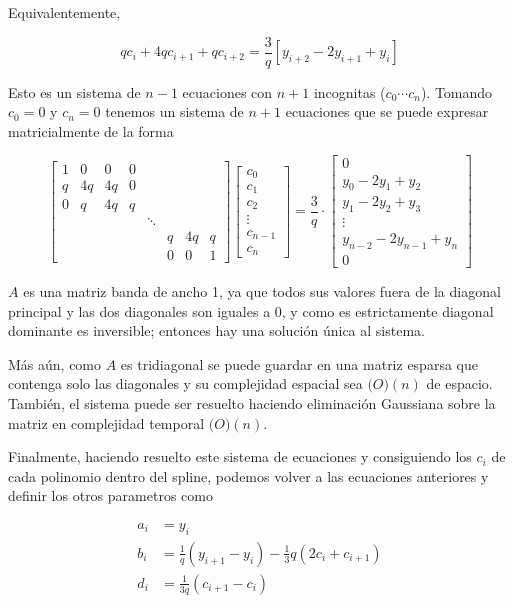 Equivalentemente,

\[
q c_i + 4 q c_{i + 1} + q c_{i + 2} = \frac{3}{q} \left[ y_{i + 2} - 2 y_{i + 1} + y_i \right]
\]

Esto es un sistema de $n - 1$ ecuaciones con $n + 1$ incognitas ($c_0 \cdots
c_n$). Tomando $c_0 = 0$ y $c_n = 0$ tenemos un sistema de $n + 1$ ecuaciones
que se puede expresar matricialmente de la forma

\[
\begin{bmatrix}
1 & 0 & 0 & 0 \\
q & 4 q & 4 q & 0 \\
0 & q & 4 q & q \\
&&&& \ddots \\
&&&&& q & 4 q & q \\
&&&&& 0 & 0 & 1
\end{bmatrix}
\begin{bmatrix}
c_0 \\
c_1 \\
c_2 \\
\vdots \\
c_{n - 1} \\
c_n
\end{bmatrix}
=
\frac{3}{q} \cdot \begin{bmatrix}
0 \\
y_0 - 2 y_1 + y_2 \\
y_1 - 2 y_2 + y_3 \\
\vdots \\
y_{n - 2} - 2 y_{n - 1} + y_n \\
0
\end{bmatrix}
\]

$A$ es una matriz banda de ancho 1, ya que todos sus valores fuera de la
diagonal principal y las dos diagonales son iguales a $0$, y como es
estrictamente diagonal dominante es inversible; entonces hay una soluci\'on
\'unica al sistema.

M\'as a\'un, como $A$ es tridiagonal se puede guardar en una matriz esparsa que
contenga solo las diagonales y su complejidad espacial sea $\mathbb(O)(n)$ de
espacio. Tambi\'en, el sistema puede ser resuelto haciendo eliminaci\'on
Gaussiana sobre la matriz en complejidad temporal $\mathbb(O)(n)$.

Finalmente, haciendo resuelto este sistema de ecuaciones y consiguiendo los
$c_i$ de cada polinomio dentro del spline, podemos volver a las ecuaciones
anteriores y definir los otros parametros como

\[
\begin{split}
a_i & = y_i \\
b_i & = \frac{1}{q} (y_{i + 1} - y_i) - \frac{1}{3} q (2 c_i + c_{i + 1}) \\
d_i & = \frac{1}{3 q} (c_{i + 1} - c_i)
\end{split}
\]

